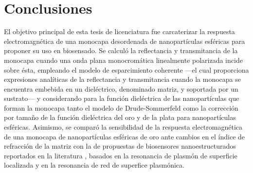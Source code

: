 \chapter*{Conclusiones}
\label{chapter:Conclusiones}

El objetivo principal de esta tesis de licenciatura fue carcaterizar la respuesta electromagnética de una monocapa desordenada de nanopartículas esféricas para proponer su uso en biosensado. Se calculó la  reflectancia y transmitancia de la monocapa cuando una onda plana monocromática linealmente polarizada incide sobre ésta, empleando el modelo de esparcimiento coherente \cite{reyes2018analytical,pena-gomar2006coherent,barrera1991optical,garcia2012multiple} ---el cual proporciona expresiones analíticas de la reflectancia y transmitancia cuando la monocapa se encuentra embebida en un dieléctrico, denominado matriz, y soportada por un sustrato--- y considerando para  la función dieléctrica de las nanopartículas que forman la monocapa tanto el modelo de Drude-Sommerfeld como  la corrección por tamaño de la función dieléctrica del oro y de la plata para nanopartículas esféricas. Asimismo, se comparó la sensibilidad de la respuesta electromagnética de una monocapa de nanopartículas esféricas de oro ante cambios en el índice de refracción de la matriz con la de propuestas de biosensores nanoestructurados reportados en la literatura \cite{svedendahl2009refractometric,kabashin2009plasmonic,danilov2018ultra}, basados en la resonancia de plasmón de superficie localizada y en la resonancia de red de superfice plasmónica. %

